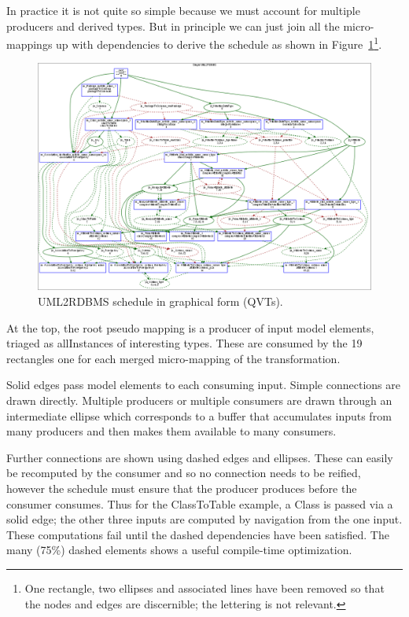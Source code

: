 \documentclass{llncs}
\begin{document}
In practice it is not quite so simple because we must account for multiple producers and derived types. But in principle we can just join all the micro-mappings up with dependencies to derive the schedule as shown in Figure~\ref{fig:UML2RDBMS.qvts}\footnote{One rectangle, two ellipses and associated lines have been removed so that the nodes and edges are discernible; the lettering is not relevant.}.

\begin{figure}[h]
	\centering
	\includegraphics[width=1.0\textwidth]{UML2RDBMS-qvts.png}
	\caption{UML2RDBMS schedule in graphical form (QVTs).}
	\label{fig:UML2RDBMS.qvts}
\end{figure}

At the top, the root pseudo mapping is a producer of input model elements, triaged as allInstances of interesting types. These are consumed by the 19 rectangles one for each merged micro-mapping of the transformation.

Solid edges pass model elements to each consuming input. Simple connections are drawn directly. Multiple producers or multiple consumers are drawn through an intermediate ellipse which corresponds to a buffer that accumulates inputs from many producers and then makes them available to many consumers.

Further connections are shown using dashed edges and ellipses. These can easily be recomputed by the consumer and so no connection needs to be reified, however the schedule must ensure that the producer produces before the consumer consumes. Thus for the ClassToTable example, a Class is passed via a solid edge; the other three inputs are computed by navigation from the one input. These computations fail until the dashed dependencies have been satisfied.
The many (75\%) dashed elements shows a useful compile-time optimization.
\end{document}
